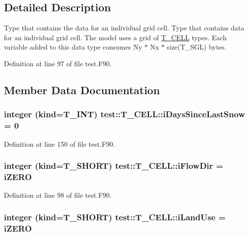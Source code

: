 \subsection{Detailed Description}
Type that contains the data for an individual grid cell. Type that contains data for an individual grid cell. The model uses a grid of \hyperlink{typetest_1_1_t___c_e_l_l}{T\_\-CELL} types. Each variable added to this data type consumes Ny $\ast$ Nx $\ast$ size(T\_\-SGL) bytes. 

Definition at line 97 of file test.F90.



\subsection{Member Data Documentation}
\hypertarget{typetest_1_1_t___c_e_l_l_a01c31db1b569e45ad8f2805a957e6dd0}{
\subsubsection[{iDaysSinceLastSnow}]{\setlength{\rightskip}{0pt plus 5cm}integer (kind={\bf T\_\-INT}) {\bf test::T\_\-CELL::iDaysSinceLastSnow} = 0}}
\label{typetest_1_1_t___c_e_l_l_a01c31db1b569e45ad8f2805a957e6dd0}


Definition at line 150 of file test.F90.

\hypertarget{typetest_1_1_t___c_e_l_l_a87c1f47ab3a9eb3571574ea9d8bdd25c}{
\subsubsection[{iFlowDir}]{\setlength{\rightskip}{0pt plus 5cm}integer (kind={\bf T\_\-SHORT}) {\bf test::T\_\-CELL::iFlowDir} = {\bf iZERO}}}
\label{typetest_1_1_t___c_e_l_l_a87c1f47ab3a9eb3571574ea9d8bdd25c}


Definition at line 98 of file test.F90.

\hypertarget{typetest_1_1_t___c_e_l_l_aeffdf08d20c284018bf745a8f5ad008c}{
\subsubsection[{iLandUse}]{\setlength{\rightskip}{0pt plus 5cm}integer (kind={\bf T\_\-SHORT}) {\bf test::T\_\-CELL::iLandUse} = {\bf iZERO}}}
\label{typetest_1_1_t___c_e_l_l_aeffdf08d20c284018bf745a8f5ad008c}


